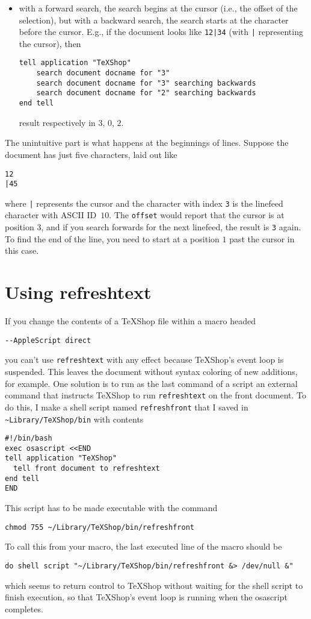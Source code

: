\documentclass[11pt]{amsart}
\def\TeXShop{\TeX Shop\xspace}
\begin{document}
\begin{itemize}
\item
with a forward search, the search begins at the cursor (i.e., the offset of the selection), but with a backward search, the search starts at the character before the cursor. E.g., if the document looks like \verb+12|34+ (with \verb+|+ representing the cursor), then
\begin{verbatim}
tell application "TeXShop"
    search document docname for "3"
    search document docname for "3" searching backwards
    search document docname for "2" searching backwards    
end tell
\end{verbatim}
result respectively in  $3$, $0$, $2$.
\end{itemize}
The unintuitive part is what happens at the beginnings of lines. Suppose the document has just five characters, laid out like
\begin{verbatim}
12
|45
\end{verbatim}
where \verb+|+ represents the cursor and the character with index {\tt 3} is the linefeed character with ASCII ID~$10$. The {\tt offset} would report that the cursor is at position $3$, and if you search forwards for the next linefeed, the result is {\tt 3} again. To find the end of the line, you need to start at a position $1$ past the cursor in this case.


\section{Using refreshtext}
If you change the contents of a \TeXShop file within a macro headed\begin{verbatim}
--AppleScript direct
\end{verbatim}
you can't use {\tt refreshtext} with any effect because \TeXShop's event loop is suspended. This leaves the document without syntax coloring of new additions, for example. One solution is to run as the last command of a script an external command that instructs \TeXShop to run {\tt refreshtext} on the front document. To do this, I make a shell script named {\tt refreshfront} that I saved in \verb|~Library/TeXShop/bin|  with contents
\begin{verbatim}
#!/bin/bash
exec osascript <<END
tell application "TeXShop"
  tell front document to refreshtext
end tell
END
\end{verbatim}
This script has to be made executable with the command
\begin{verbatim}
chmod 755 ~/Library/TeXShop/bin/refreshfront 
\end{verbatim}
To call this from your macro, the last executed line of the macro should be
\begin{verbatim}
do shell script "~/Library/TeXShop/bin/refreshfront &> /dev/null &"
\end{verbatim}
which seems to return control to \TeXShop without waiting for the shell script to finish execution, so that \TeXShop's event loop is running when the osascript completes.
\end{document}
